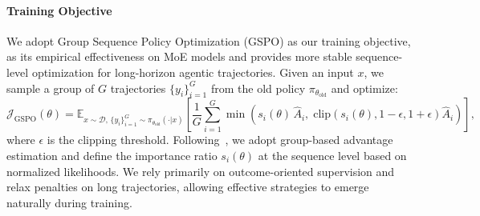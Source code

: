 \documentclass{article}
\begin{document}
\paragraph{Training Objective}
We adopt Group Sequence Policy Optimization (GSPO) as our training objective, as its empirical effectiveness on MoE models and provides more stable sequence-level optimization for long-horizon agentic trajectories.
Given an input $x$, we sample a group of $G$ trajectories $\{y_i\}_{i=1}^G$ from the old policy $\pi_{\theta_{\text{old}}}$ and optimize:
\begin{equation}
\mathcal{J}_{\text{GSPO}}(\theta)
=
\mathbb{E}_{x \sim \mathcal{D},\, \{y_i\}_{i=1}^G \sim \pi_{\theta_{\text{old}}}(\cdot|x)}
\left[
\frac{1}{G}
\sum_{i=1}^G
\min\!\left(
s_i(\theta)\,\hat{A}_i,\;
\mathrm{clip}\!\left(s_i(\theta), 1-\epsilon, 1+\epsilon\right)\hat{A}_i
\right)
\right],
\end{equation}
where $\epsilon$ is the clipping threshold.
Following~\cite{gspo}, we adopt group-based advantage estimation and define the importance ratio $s_i(\theta)$ at the sequence level based on normalized likelihoods.
We rely primarily on outcome-oriented supervision and relax penalties on long trajectories, allowing effective strategies to emerge naturally during training.
\end{document}
